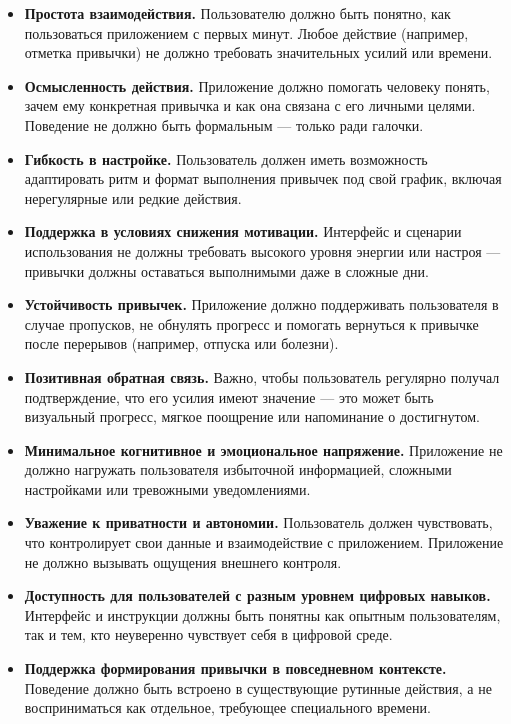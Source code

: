 \documentclass[pdflatex,sn-mathphys-num]{sn-jnl}%
\theoremstyle{thmstyleone}%
\theoremstyle{thmstyletwo}%
\theoremstyle{thmstylethree}%
\begin{document}
\begin{itemize}
    \item \textbf{Простота взаимодействия.} Пользователю должно быть понятно, как пользоваться приложением с первых минут. Любое действие (например, отметка привычки) не должно требовать значительных усилий или времени.

    \item \textbf{Осмысленность действия.} Приложение должно помогать человеку понять, зачем ему конкретная привычка и как она связана с его личными целями. Поведение не должно быть формальным — только ради галочки.

    \item \textbf{Гибкость в настройке.} Пользователь должен иметь возможность адаптировать ритм и формат выполнения привычек под свой график, включая нерегулярные или редкие действия.

    \item \textbf{Поддержка в условиях снижения мотивации.} Интерфейс и сценарии использования не должны требовать высокого уровня энергии или настроя — привычки должны оставаться выполнимыми даже в сложные дни.

    \item \textbf{Устойчивость привычек.} Приложение должно поддерживать пользователя в случае пропусков, не обнулять прогресс и помогать вернуться к привычке после перерывов (например, отпуска или болезни).

    \item \textbf{Позитивная обратная связь.} Важно, чтобы пользователь регулярно получал подтверждение, что его усилия имеют значение — это может быть визуальный прогресс, мягкое поощрение или напоминание о достигнутом.

    \item \textbf{Минимальное когнитивное и эмоциональное напряжение.} Приложение не должно нагружать пользователя избыточной информацией, сложными настройками или тревожными уведомлениями.

    \item \label{req:privacy} \textbf{Уважение к приватности и автономии.} Пользователь должен чувствовать, что контролирует свои данные и взаимодействие с приложением. Приложение не должно вызывать ощущения внешнего контроля.

    \item \textbf{Доступность для пользователей с разным уровнем цифровых навыков.} Интерфейс и инструкции должны быть понятны как опытным пользователям, так и тем, кто неуверенно чувствует себя в цифровой среде.

    \item \textbf{Поддержка формирования привычки в повседневном контексте.} Поведение должно быть встроено в существующие рутинные действия, а не восприниматься как отдельное, требующее специального времени.

\end{itemize}
\end{document}
